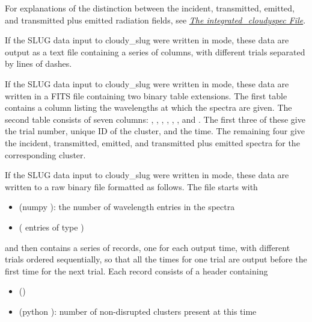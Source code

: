 \documentclass[letterpaper,10pt,english]{sphinxmanual}
\begin{document}
For explanations of the distinction between the incident, transmitted,
emitted, and transmitted plus emitted radiation fields, see
{\hyperref[cloudy:sssec-int-cloudyspec-file]{\emph{The integrated\_cloudyspec File}}}.

If the SLUG data input to cloudy\_slug were written in  mode,
these data are output as a text file containing a series of columns,
with different trials separated by lines of dashes.

If the SLUG data input to cloudy\_slug were written in  mode,
these data are written in a FITS file containing two binary table
extensions. The first table contains a column  listing
the wavelengths at which the spectra are given. The second table
consists of seven columns: , , ,
, , ,
and . The first three of these
give the trial number, unique ID of the cluster, and the time. The
remaining four give the incident, transmitted, emitted, and
transmitted plus emitted spectra for the corresponding cluster.

If the SLUG data input to cloudy\_slug were written in  mode,
these data are written to a raw binary file formatted as follows. The
file starts with
\begin{itemize}
\item {} 
 (numpy ): the number of wavelength entries in the spectra

\item {} 
 ( entries of type )

\end{itemize}

and then contains a series of records, one for each output time, with
different trials ordered sequentially, so that all the times for one
trial are output before the first time for the next trial. Each record
consists of a header containing
\begin{itemize}
\item {} 
 ()

\item {} 
 (python ): number of non-disrupted clusters present at this time

\end{itemize}
\end{document}
